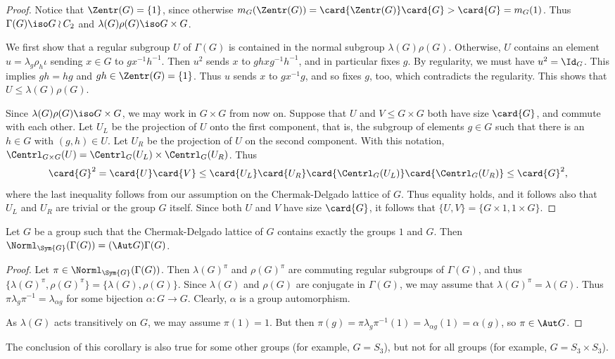 \begin{proof}
    Notice that $\Zentr(G)=\{1\}$, since otherwise
    $m_G(\Zentr(G))=\card{\Zentr(G)}\card{G} > \card{G} = m_G(1)$.
    Thus $\Gamma(G)\iso G\wr C_2$
    and $\lambda(G)\rho(G) \iso G\times G$.
    
    We first show that a regular subgroup $U$ of 
    $\Gamma(G)$ is contained in the normal subgroup
    $\lambda(G) \rho(G)$.
    Otherwise, $U$
    contains an element $u = \lambda_g \rho_h \iota$
    sending $x\in G$ to $ g x^{-1} h^{-1}$.
    Then $u^2$ sends $x$ to $gh x g^{-1}h^{-1}$,
    and in particular fixes $g$.
    By regularity, we must have $u^2 = \Id_G$. 
    This implies 
    $gh = hg $ and 
    $gh\in \Zentr(G) = \{1\}$.
    Thus $u$ sends $x$ to $g x^{-1}g$,
    and so fixes $g$, too, 
    which contradicts the regularity. 
    This shows that $U \leq \lambda(G) \rho(G)$.
    
    Since $\lambda(G) \rho(G)\iso G\times G$, we may work
    in $G\times G$ from now on.
    Suppose that $U$ and $V\leq G\times G$ 
    both have size $\card{G}$,
    and commute with each other.
    Let $U_L$ be the projection of $U$ 
    onto the first component, 
    that is, the subgroup of elements
    $g\in G$ such that there is an $h\in G$
    with $(g,h)\in U$.
    Let $U_R$ be the projection of $U$ on the second component.
    With this notation,
    $\Centrl_{G\times G}(U) = \Centrl_{G}(U_L)\times \Centrl_{G}(U_R)$.
    Thus 
    \[ \card{G}^2 
       = \card{U}\card{V}
       \leq \card{U_L}\card{U_R}
            \card{\Centrl_{G}(U_L)}\card{\Centrl_{G}(U_R)}
       \leq \card{G}^2,
    \]
    where the last inequality follows from our assumption
    on the Chermak-Delgado lattice of $G$.
    Thus equality holds, and it follows also that
    $U_L$ and $U_R$ are trivial or the group $G$ itself.
    Since both $U$ and $V$ have size $\card{G}$,
    it follows that
    $\{U,V\} = \{G\times 1, 1\times G\}$.
\end{proof}

\begin{cor}\label{c:normlgamma}
  Let $G$ be a group such that the Chermak-Delgado lattice of $G$
  contains exactly the groups $1$ and $G$.
  Then $\Norml_{\Sym{G}}(\Gamma(G)) = (\Aut G)\Gamma(G)$.    
\end{cor}

\begin{proof}
  Let $\pi \in \Norml_{\Sym{G}}(\Gamma(G))$.
  Then $\lambda(G)^{\pi}$ and $\rho(G)^{\pi}$
  are commuting regular subgroups of $\Gamma(G)$,
  and thus 
  $\{\lambda(G)^{\pi},\rho(G)^{\pi}\}
   = \{ \lambda(G), \rho(G)\} $.
  Since $\lambda(G)$ and $\rho(G)$ are conjugate in 
  $\Gamma(G)$, 
  we may assume that $\lambda(G)^{\pi}= \lambda(G)$.
  Thus $\pi \lambda_g \pi^{-1} = \lambda_{\alpha g}$
  for some bijection $\alpha\colon G\to G$.
  Clearly, $\alpha$ is a group automorphism.
  
  As $\lambda(G)$ acts transitively on $G$, we may assume
  $\pi(1) = 1$. 
  But then 
  $\pi(g) = \pi\lambda_g \pi^{-1}(1)
          = \lambda_{\alpha g}(1)
          = \alpha(g)$,
  so $\pi\in \Aut G$.
\end{proof}

The conclusion of this corollary is also true for some other
groups (for example, $G=S_3$),
but not for all groups (for example, $G= S_3 \times S_3$).

